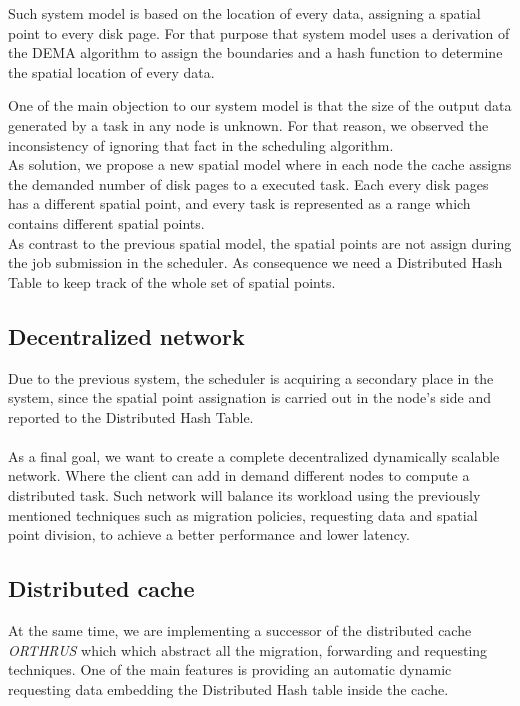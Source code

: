 Such system model is based on the location of every data, assigning a spatial point to every 
disk page. For that purpose that system model uses a derivation of the DEMA algorithm to 
assign the boundaries and a hash function to determine the spatial location of every data.

One of the main objection to our system model is that the size of the output data generated 
by a task in any node is unknown. For that reason, we observed the inconsistency of ignoring
that fact in the scheduling algorithm. \\

As solution, we propose a new spatial model where in each node the cache assigns the demanded
number of disk pages to a executed task. Each every disk pages has a different spatial point,
and every task is represented as a range which contains different spatial points.\\

As contrast to the previous spatial model, the spatial points are not assign during the job submission in 
the scheduler. As consequence we need a Distributed Hash Table to keep track of the whole set of spatial points.


\subsection*{Decentralized network}
Due to the previous system, the scheduler is acquiring a secondary place in the system, since the spatial point 
assignation is carried out in the node's side and reported to the Distributed Hash Table. \\\\
As a final goal, we want to create a complete decentralized dynamically scalable network.
Where the client can add in demand different nodes to compute a distributed task. Such network will
balance its workload using the previously mentioned techniques such as migration policies, requesting data and
spatial point division, to achieve a better performance and lower latency. 

\subsection*{Distributed cache}
At the same time, we are implementing a successor of the distributed cache \textit{ORTHRUS} which
which abstract all the migration, forwarding and requesting techniques. One of the main features
is providing an automatic dynamic requesting data embedding the Distributed Hash table inside the
cache.

